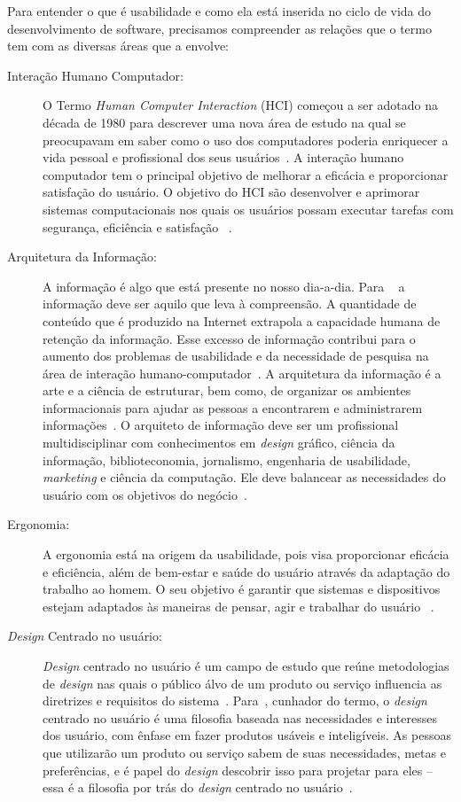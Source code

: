 Para entender o que é usabilidade e como ela está inserida no ciclo de vida do desenvolvimento de software, precisamos compreender as relações que o termo tem com as diversas áreas que a envolve: 

\begin{description}

\item[Interação Humano Computador:]
%
O Termo \emph{Human Computer Interaction} (HCI) começou a ser adotado na década de 1980 para descrever uma nova área de estudo na qual se preocupavam em saber como o uso dos computadores poderia enriquecer a vida pessoal e profissional dos seus usuários~\cite{moraes2002}.
%
A interação humano computador tem o principal objetivo de melhorar a eficácia e proporcionar satisfação do usuário. O objetivo do HCI são desenvolver e aprimorar sistemas computacionais nos quais os usuários possam executar tarefas com segurança, eficiência e satisfação ~\cite{preece2007}.
	
\item[Arquitetura da Informação:]
%
A informação é algo que está presente no nosso dia-a-dia. Para ~ a informação deve ser aquilo que leva à compreensão. A quantidade de conteúdo que é produzido na Internet extrapola a capacidade humana de retenção da informação. Esse excesso de informação contribui para o aumento dos problemas de usabilidade e da necessidade de pesquisa na área de interação humano-computador~\cite{agner2004}.
%
A arquitetura da informação é a arte e a ciência de estruturar, bem como, de organizar os ambientes informacionais para ajudar as pessoas a encontrarem e administrarem informações~\cite{garret2003}.
%
O arquiteto de informação deve ser um profissional multidisciplinar com conhecimentos em \emph{design} gráfico, ciência da informação, biblioteconomia, jornalismo, engenharia de usabilidade, \emph{marketing} e ciência da computação. Ele deve balancear as necessidades do usuário com os objetivos do negócio~\cite{rosenfeld1998}.

\item[Ergonomia:]
%
A ergonomia está na origem da usabilidade, pois visa proporcionar eficácia e eficiência, além de bem-estar e saúde do usuário através da adaptação do trabalho ao homem.
%
O seu objetivo é garantir que sistemas e dispositivos estejam adaptados às maneiras de pensar, agir e trabalhar do usuário~\cite{cybis2010} .

\item[\emph{Design} Centrado no usuário:]
%
\emph{Design} centrado no usuário é um campo de estudo que reúne metodologias de \emph{design} nas quais o público álvo de um produto ou serviço influencia as diretrizes e requisitos do sistema~\cite{norman2006design}.
%
Para~, cunhador do termo, o \emph{design} centrado no usuário é uma filosofia baseada nas necessidades e interesses dos usuário, com ênfase em fazer produtos usáveis e inteligíveis. 
%
As pessoas que utilizarão um produto ou serviço sabem de suas necessidades, metas e preferências, e é papel do \emph{design} descobrir isso para projetar para eles -- essa é a filosofia por trás do \emph{design} centrado no usuário~\cite{saffer2010designing}.


\end{description}
